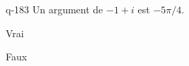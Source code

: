 \begin{truefalse}{q-183}
Un argument de $-1+i$ est $-5\pi/4$.
\item* Vrai
\item Faux
\end{truefalse}

